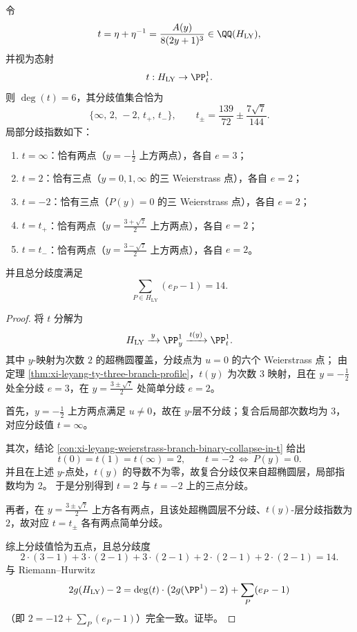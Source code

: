 \begin{conclusion}\label{con:xi-leyang-t-map-degree6-five-branch-values}
令
\[
t=\eta+\eta^{-1}=\frac{A(y)}{8(2y+1)^3}\in \QQ(H_{\mathrm{LY}}),
\]
并视为态射
\[
t:H_{\mathrm{LY}}\to\PP^1_t.
\]
则 \(\deg(t)=6\)，其分歧值集合恰为
\[
\{\infty,\,2,\,-2,\,t_+,\,t_-\},
\qquad
t_\pm=\frac{139}{72}\pm\frac{7\sqrt7}{144}.
\]
局部分歧指数如下：
\begin{enumerate}
  \item \(t=\infty\)：恰有两点（\(y=-\frac12\) 上方两点），各自 \(e=3\)；
  \item \(t=2\)：恰有三点（\(y=0,1,\infty\) 的三 Weierstrass 点），各自 \(e=2\)；
  \item \(t=-2\)：恰有三点（\(P(y)=0\) 的三 Weierstrass 点），各自 \(e=2\)；
  \item \(t=t_+\)：恰有两点（\(y=\frac{3+\sqrt7}{2}\) 上方两点），各自 \(e=2\)；
  \item \(t=t_-\)：恰有两点（\(y=\frac{3-\sqrt7}{2}\) 上方两点），各自 \(e=2\)。
\end{enumerate}
并且总分歧度满足
\[
\sum_{P\in H_{\mathrm{LY}}}(e_P-1)=14.
\]
\end{conclusion}
\begin{proof}
将 \(t\) 分解为
\[
H_{\mathrm{LY}}\xrightarrow{\,y\,}\PP^1_y\xrightarrow{\,t(y)\,}\PP^1_t.
\]
其中 \(y\)-映射为次数 \(2\) 的超椭圆覆盖，分歧点为 \(u=0\) 的六个 Weierstrass 点；
由定理 \ref{thm:xi-leyang-ty-three-branch-profile}，\(t(y)\) 为次数 \(3\) 映射，且在
\(
y=-\frac12
\)
处全分歧 \(e=3\)，在
\(
y=\frac{3\pm\sqrt7}{2}
\)
处简单分歧 \(e=2\)。

首先，\(y=-\frac12\) 上方两点满足 \(u\neq0\)，故在 \(y\)-层不分歧；复合后局部次数均为 \(3\)，对应分歧值 \(t=\infty\)。

其次，结论 \ref{con:xi-leyang-weierstrass-branch-binary-collapse-in-t} 给出
\[
t(0)=t(1)=t(\infty)=2,\qquad
t=-2\ \Longleftrightarrow\ P(y)=0.
\]
并且在上述 \(y\)-点处，\(t(y)\) 的导数不为零，故复合分歧仅来自超椭圆层，局部指数均为 \(2\)。
于是分别得到 \(t=2\) 与 \(t=-2\) 上的三点分歧。

再者，在 \(y=\frac{3\pm\sqrt7}{2}\) 上方各有两点，且该处超椭圆层不分歧、\(t(y)\)-层分歧指数为 \(2\)，故对应 \(t=t_\pm\) 各有两点简单分歧。

综上分歧值恰为五点，且总分歧度
\[
2\cdot(3-1)+3\cdot(2-1)+3\cdot(2-1)+2\cdot(2-1)+2\cdot(2-1)=14.
\]
与 Riemann--Hurwitz
\[
2g(H_{\mathrm{LY}})-2
=\deg(t)\cdot\bigl(2g(\PP^1)-2\bigr)+\sum_P(e_P-1)
\]
（即 \(2=-12+\sum_P(e_P-1)\)）完全一致。证毕。
\end{proof}

